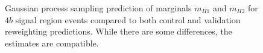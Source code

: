 \begin{figure}[ht]
	\centering
	\caption{\label{fig:gp-marginals-4b-18} Gaussian process sampling prediction of marginals $m_{H1}$ and $m_{H2}$ 
	for $4b$ signal region events compared to both control and validation reweighting predictions. While there
	are some differences, the estimates are compatible.}
\end{figure}


